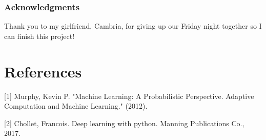 \documentclass{article}
\begin{document}
\subsubsection*{Acknowledgments}
Thank you to my girlfriend, Cambria, for giving up our Friday night together so I can finish this project!

\section*{References}

\small

[1] Murphy, Kevin P. "Machine Learning: A Probabilistic Perspective. Adaptive Computation and Machine Learning." (2012).

[2] Chollet, Francois. Deep learning with python. Manning Publications Co., 2017.
\end{document}
